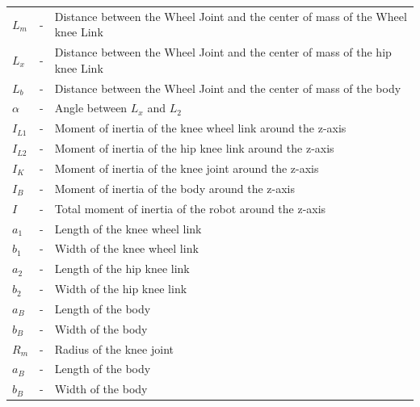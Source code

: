 \begin{table}[h!]
\begin{tabular}{lcl}
			$L_m$ & - & Distance between the Wheel Joint and the center of mass of the Wheel knee Link \\
			$L_x$ & - & Distance between the Wheel Joint and the center of mass of the hip knee Link \\
			$L_b$ & - & Distance between the Wheel Joint and the center of mass of the body \\
			$\alpha$ & - & Angle between $L_x$ and $L_2$ \\
			$I_{L1}$ & - & Moment of inertia of the knee wheel link around the z-axis \\
			$I_{L2}$ & - & Moment of inertia of the hip knee link around the z-axis \\
			$I_K$ & - & Moment of inertia of the knee joint around the z-axis \\
			$I_B$ & - & Moment of inertia of the body around the z-axis \\
			$I$ & - & Total moment of inertia of the robot around the z-axis \\
			$a_1$ & - & Length of the knee wheel link \\
			$b_1$ & - & Width of the knee wheel link \\
			$a_2$ & - & Length of the hip knee link \\
			$b_2$ & - & Width of the hip knee link \\
			$a_B$ & - & Length of the body \\
			$b_B$ & - & Width of the body \\
			$R_m$ & - & Radius of the knee joint \\
			$a_B$ & - & Length of the body \\
			$b_B$ & - & Width of the body \\
			\bottomrule
		\end{tabular}
	\end{table}




\newpage
